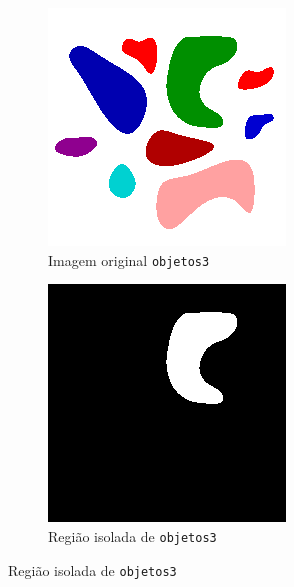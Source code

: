\documentclass[brazilian,a4paper,twocolumn]{article}
\begin{document}
\begin{figure}[H]
            \begin{subfigure}{0.23\textwidth}
                \includegraphics[width=\textwidth,keepaspectratio]{objetos3}
                \caption{Imagem original \texttt{objetos3}}
                \label{fig:objetos3-regioes-orig}
            \end{subfigure}
            \hfill
            \begin{subfigure}{0.23\textwidth}
                \includegraphics[width=\textwidth,keepaspectratio]{regioes/objetos3-region-2}
                \caption{Região isolada de \texttt{objetos3}}
                \label{fig:objetos3-regioes-isolada}
            \end{subfigure}


\end{figure}
\end{document}
